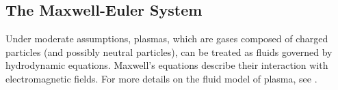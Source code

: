 \documentclass{article}
\begin{document}

\subsection{The Maxwell-Euler System}
Under moderate assumptions, plasmas, which are gases composed of charged particles (and possibly neutral particles), can be treated as fluids governed by hydrodynamic equations. Maxwell's equations describe their interaction with electromagnetic fields. For more details on the fluid model of plasma, see \cite{chen2016, remi_2014}.
\end{document}
